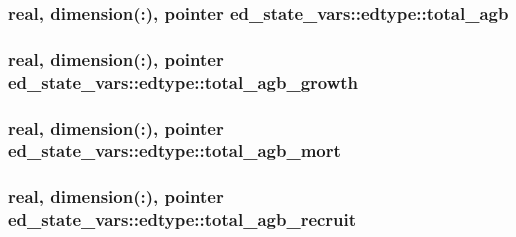 \subsubsection[{\texorpdfstring{total\+\_\+agb}{total_agb}}]{\setlength{\rightskip}{0pt plus 5cm}real, dimension(\+:), pointer ed\+\_\+state\+\_\+vars\+::edtype\+::total\+\_\+agb}\hypertarget{structed__state__vars_1_1edtype_add949252f6c92bb0d3c0a4d9e6d630c5}{}\label{structed__state__vars_1_1edtype_add949252f6c92bb0d3c0a4d9e6d630c5}
\subsubsection[{\texorpdfstring{total\+\_\+agb\+\_\+growth}{total_agb_growth}}]{\setlength{\rightskip}{0pt plus 5cm}real, dimension(\+:), pointer ed\+\_\+state\+\_\+vars\+::edtype\+::total\+\_\+agb\+\_\+growth}\hypertarget{structed__state__vars_1_1edtype_af7d099aeecb5c88c6f48676c0036ae39}{}\label{structed__state__vars_1_1edtype_af7d099aeecb5c88c6f48676c0036ae39}
\subsubsection[{\texorpdfstring{total\+\_\+agb\+\_\+mort}{total_agb_mort}}]{\setlength{\rightskip}{0pt plus 5cm}real, dimension(\+:), pointer ed\+\_\+state\+\_\+vars\+::edtype\+::total\+\_\+agb\+\_\+mort}\hypertarget{structed__state__vars_1_1edtype_a85eea48343c460b50abc304be6246ffc}{}\label{structed__state__vars_1_1edtype_a85eea48343c460b50abc304be6246ffc}
\subsubsection[{\texorpdfstring{total\+\_\+agb\+\_\+recruit}{total_agb_recruit}}]{\setlength{\rightskip}{0pt plus 5cm}real, dimension(\+:), pointer ed\+\_\+state\+\_\+vars\+::edtype\+::total\+\_\+agb\+\_\+recruit}\hypertarget{structed__state__vars_1_1edtype_a02d21b125e29153458ca8b220e08f195}{}\label{structed__state__vars_1_1edtype_a02d21b125e29153458ca8b220e08f195}
